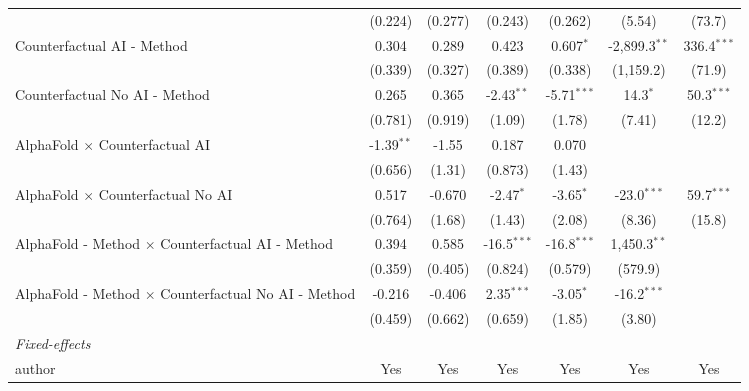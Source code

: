 \begin{tabular}{lcccccc}
                                                              & (0.224)       & (0.277) & (0.243)       & (0.262)       & (5.54)          & (73.7)\\   
   Counterfactual AI - Method                                 & 0.304         & 0.289   & 0.423         & 0.607$^{*}$   & -2,899.3$^{**}$ & 336.4$^{***}$\\   
                                                              & (0.339)       & (0.327) & (0.389)       & (0.338)       & (1,159.2)       & (71.9)\\   
   Counterfactual No AI - Method                              & 0.265         & 0.365   & -2.43$^{**}$  & -5.71$^{***}$ & 14.3$^{*}$      & 50.3$^{***}$\\   
                                                              & (0.781)       & (0.919) & (1.09)        & (1.78)        & (7.41)          & (12.2)\\   
   AlphaFold $\times$ Counterfactual AI                       & -1.39$^{**}$  & -1.55   & 0.187         & 0.070         &                 &   \\   
                                                              & (0.656)       & (1.31)  & (0.873)       & (1.43)        &                 &   \\   
   AlphaFold $\times$ Counterfactual No AI                    & 0.517         & -0.670  & -2.47$^{*}$   & -3.65$^{*}$   & -23.0$^{***}$   & 59.7$^{***}$\\   
                                                              & (0.764)       & (1.68)  & (1.43)        & (2.08)        & (8.36)          & (15.8)\\   
   AlphaFold - Method $\times$ Counterfactual AI - Method     & 0.394         & 0.585   & -16.5$^{***}$ & -16.8$^{***}$ & 1,450.3$^{**}$  &   \\   
                                                              & (0.359)       & (0.405) & (0.824)       & (0.579)       & (579.9)         &   \\   
   AlphaFold - Method $\times$ Counterfactual No AI - Method  & -0.216        & -0.406  & 2.35$^{***}$  & -3.05$^{*}$   & -16.2$^{***}$   &   \\   
                                                              & (0.459)       & (0.662) & (0.659)       & (1.85)        & (3.80)          &   \\   
   \midrule
   \emph{Fixed-effects}\\
   author                                                     & Yes           & Yes     & Yes           & Yes           & Yes             & Yes\\  

\end{tabular}
